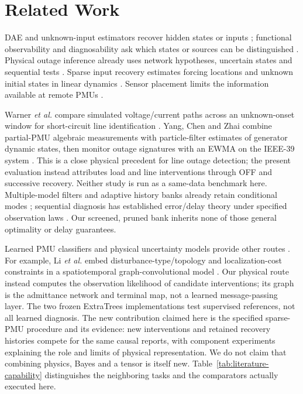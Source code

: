 \section{Related Work}
\label{sec:narrative-related}

DAE and unknown-input estimators recover hidden states or inputs
\cite{gillijns2007input,nugroho2022dae,katanic2024recursive}; functional
observability and diagnosability ask which states or sources can be
distinguished \cite{fernando2010functional,montanari2022functional,
eriksson2013diagnosability,scharf1994matched}. Physical outage inference
already uses network hypotheses, uncertain states and sequential tests
\cite{tate2008outage,zhao2014outages,chen2016quickest,
rovatsos2017outage}. Sparse input recovery estimates forcing locations
and unknown initial states in linear dynamics \cite{anguluri2023group}.
Sensor placement limits the information available at remote PMUs
\cite{jamei2020limits,conte2023fault,yildiz2025sparse}.

Warner \emph{et al.} compare simulated voltage/current paths across an
unknown-onset window for short-circuit line identification
\cite{warner2023highfidelity}. Yang, Chen and Zhai combine partial-PMU
algebraic measurements with particle-filter estimates of generator dynamic
states, then monitor outage signatures with an EWMA on the IEEE-39 system
\cite{yang2021particle}. This is a close physical precedent for line
outage detection; the present evaluation instead attributes load and line
interventions through OFF and successive recovery. Neither study is run as a
same-data benchmark here. Multiple-model filters and adaptive history banks
already retain conditional modes \cite{blom1988imm,boers2005m3h}; sequential
diagnosis has established error/delay theory under specified observation
laws \cite{warner2024matrix}. Our screened, pruned bank inherits none of
those general optimality or delay guarantees.

Learned PMU classifiers and physical uncertainty models provide other
routes \cite{pandey2020realtime,li2024knowledge,yildiz2024few,
ensaf2023kernel,tartakovsky2023gp,albustami2026dae,nagi2022trajectory}.
For example, Li \emph{et al.} embed disturbance-type/topology and
localization-cost constraints in a spatiotemporal graph-convolutional
model \cite{li2024knowledge}. Our physical route instead computes the
observation likelihood of candidate interventions; its graph is the
admittance network and terminal map, not a learned message-passing layer.
The two frozen ExtraTrees implementations test supervised references,
not all learned diagnosis. The new contribution claimed here is the
specified sparse-PMU procedure and its evidence: new interventions and
retained recovery histories compete for the same causal reports, with
component experiments explaining the role and limits of physical
representation. We do not claim that combining physics, Bayes and a
tensor is itself new. Table~\ref{tab:literature-capability} distinguishes the
neighboring tasks and the comparators actually executed here.

